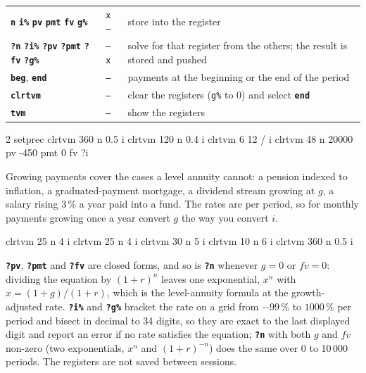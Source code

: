 \documentclass[11pt,letterpaper]{article}
\newcommand{\code}[1]{\texttt{#1}}
\newcommand{\cmd}[1]{\texttt{\textbf{#1}}}
\newcommand{\stk}[1]{\texttt{#1}}
\begin{document}
\begin{center}
\begin{tabular}{@{}llp{}@{}}
\toprule
\cmd{n} \cmd{i\%} \cmd{pv} \cmd{pmt} \cmd{fv} \cmd{g\%} & \stk{x --} & store into the register \\
\cmd{?n} \cmd{?i\%} \cmd{?pv} \cmd{?pmt} \cmd{?fv} \cmd{?g\%} & \stk{-- x} & solve for that register from the others; the result is stored and pushed \\
\cmd{beg}, \cmd{end} & \stk{--} & payments at the beginning or the end of the period \\
\cmd{clrtvm} & \stk{--} & clear the registers (\code{g\%} to 0) and select \cmd{end} \\
\cmd{tvm} & \stk{--} & show the registers \\
\bottomrule
\end{tabular}
\end{center}

\begin{rpn}
2 setprec
clrtvm 360 n 0.5 i%
clrtvm 120 n 0.4 i%
clrtvm 6 12 / i%
clrtvm 48 n 20000 pv -450 pmt 0 fv ?i%
\end{rpn}
Growing payments cover the cases a level annuity cannot: a pension indexed to inflation, a graduated-payment mortgage, a dividend stream growing at $g$, a salary rising 3\,\% a year paid into a fund. The rates are per period, so for monthly payments growing once a year convert $g$ the way you convert $i$.
\begin{rpn}
clrtvm 25 n 4 i%
clrtvm 25 n 4 i%
clrtvm 30 n 5 i%
clrtvm 10 n 6 i%
clrtvm 360 n 0.5 i%
\end{rpn}
\cmd{?pv}, \cmd{?pmt} and \cmd{?fv} are closed forms, and so is \cmd{?n} whenever $g = 0$ or $fv = 0$: dividing the equation by $(1+r)^n$ leaves one exponential, $x^n$ with $x = (1+g)/(1+r)$, which is the level-annuity formula at the growth-adjusted rate. \cmd{?i\%} and \cmd{?g\%} bracket the rate on a grid from $-99\,\%$ to $1000\,\%$ per period and bisect in decimal to 34 digits, so they are exact to the last displayed digit and report an error if no rate satisfies the equation; \cmd{?n} with both $g$ and $fv$ non-zero (two exponentials, $x^n$ and $(1+r)^{-n}$) does the same over 0 to 10\,000 periods. The registers are not saved between sessions.
\end{document}
